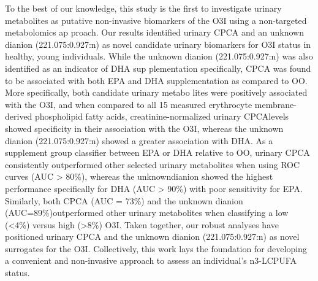 \documentclass[journal=jacsat,manuscript=article]{achemso}
\begin{document}
To the best of our knowledge, this study is the first to investigate
urinary metabolites as putative non-invasive biomarkers of the O3I using
a non-targeted metabolomics ap proach. Our results identified urinary
CPCA and an unknown dianion (221.075:0.927:n) as novel candidate urinary
biomarkers for O3I status in healthy, young individuals. While the
unknown dianion (221.075:0.927:n) was also identified as an indicator of
DHA sup plementation specifically, CPCA was found to be associated with
both EPA and DHA supplementation as compared to OO. More specifically,
both candidate urinary metabo lites were positively associated with the
O3I, and when compared to all 15 measured erythrocyte membrane-derived
phospholipid fatty acids, creatinine-normalized urinary CPCAlevels
showed specificity in their association with the O3I, whereas the
unknown dianion (221.075:0.927:n) showed a greater association with DHA.
As a supplement group classifier between EPA or DHA relative to OO,
urinary CPCA consistently outperformed other selected urinary
metabolites when using ROC curves (AUC \textgreater{} 80\%), whereas the
unknowndianion showed the highest performance specifically for DHA (AUC
\textgreater{} 90\%) with poor sensitivity for EPA. Similarly, both CPCA
(AUC = 73\%) and the unknown dianion (AUC=89\%)outperformed other
urinary metabolites when classifying a low (\textless4\%) versus high
(\textgreater8\%) O3I. Taken together, our robust analyses have
positioned urinary CPCA and the unknown dianion (221.075:0.927:n) as
novel surrogates for the O3I. Collectively, this work lays the
foundation for developing a convenient and non-invasive approach to
assess an individual's n3-LCPUFA status.
\end{document}
